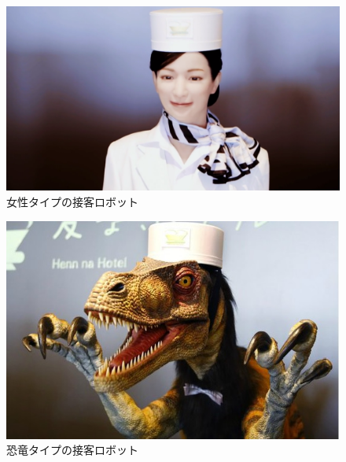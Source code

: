 \documentclass[12pt,oneside]{sotsuken_paper}
\begin{document}
\begin{figure}[htbp]
\begin{center}
\includegraphics[width=120mm]{img/huistenbosch_human.png}
\caption{女性タイプの接客ロボット}
\label{fig:huistenbosch_human}
\end{center}
\end{figure}


\begin{figure}[htbp]
\begin{center}
\includegraphics[width=120mm]{img/huistenbosch_dinosaur.jpg}
\caption{恐竜タイプの接客ロボット}
\label{fig:huistenbosch_dinosaur}
\end{center}
\end{figure}
\end{document}
